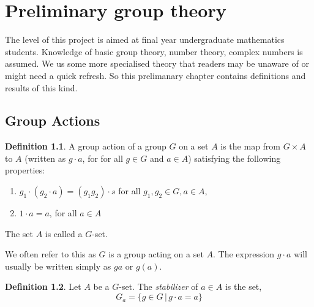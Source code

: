
\newtheorem{theorem}{Theorem}[section]
\newtheorem{lemma}[theorem]{Lemma}
\newtheorem{proposition}[theorem]{Proposition}
\newtheorem{corollary}[theorem]{Corollary}
\theoremstyle{definition}
\newtheorem{example}[theorem]{Example}
\theoremstyle{definition}
\newtheorem{remark}[theorem]{Remark}
\theoremstyle{definition}
\newtheorem{definition}[theorem]{Definition}


\chapter{Preliminary group theory}
\ifpdf
    \graphicspath{{Introduction/IntroductionFigs/PNG/}{Introduction/IntroductionFigs/PDF/}{Introduction/IntroductionFigs/}}
\else
    \graphicspath{{Introduction/IntroductionFigs/EPS/}{Introduction/IntroductionFigs/}}
\fi



The level of this project is aimed at final year undergraduate mathematics students. Knowledge of basic group theory, number theory, complex numbers is assumed. We us some more specialised theory that readers may be unaware of or might need a quick refresh. So this prelimanary chapter contains definitions and results of this kind. \\

\section{Group Actions}
\begin{definition}\label{def:groupAction}
A group action of a group $G$ on a set $A$ is the map from $G \times A$ to $A$ (written as $ g \cdot a$, for for all $g \in G$ and $a \in A$) satisfying the following properties:
\begin{enumerate}
\item $g_1\cdot(g_2 \cdot a) = (g_1g_2) \cdot s$  for all  $g_1, g_2 \in G, a \in A$, 
\item $1 \cdot a = a$, for all $a \in A$
\end{enumerate}
The set $A$ is called a $G$-set.
\end{definition}
We often refer to this as $G$ is a group acting on a set $A$. The expression $g \cdot a $ will usually be written simply as $ga$ or $g(a)$.

\begin{definition}
Let $A$ be a $G$-set. The \textit{stabilizer} of $a \in A$ is the set, 
$$ G_a = \{g \in G \, \vert \, g \cdot a = a \}$$
\end{definition}

